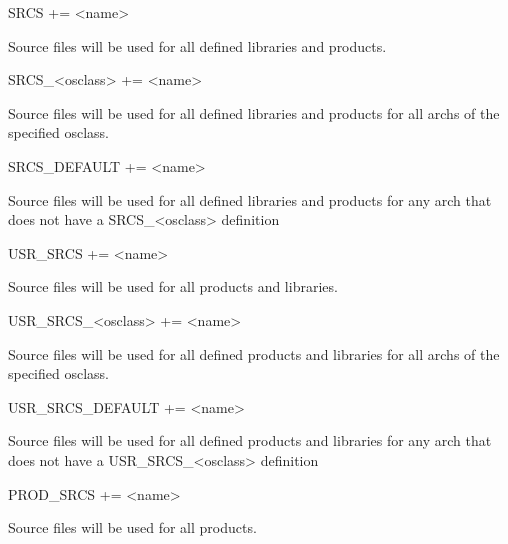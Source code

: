 \begin{description}\item {}SRCS += \textless{}name\textgreater{}

\end{description}Source files will be used for all defined libraries and products.

\begin{description}\item SRCS\_\textless{}osclass\textgreater{} += \textless{}name\textgreater{}

\end{description}Source files will be used for all defined libraries and products for all archs of the specified osclass.

\begin{description}\item SRCS\_DEFAULT += \textless{}name\textgreater{}

\end{description}Source files will be used for all defined libraries and products for any arch that does not have a 
SRCS\_\textless{}osclass\textgreater{} definition



\begin{description}\item {}USR\_SRCS += \textless{}name\textgreater{}

\end{description}Source files will be used for all products and libraries.

\begin{description}\item USR\_SRCS\_\textless{}osclass\textgreater{} += \textless{}name\textgreater{}

\end{description}Source files will be used for all defined products and libraries for all archs of the specified osclass.

\begin{description}\item USR\_SRCS\_DEFAULT += \textless{}name\textgreater{}

\end{description}Source files will be used for all defined products and libraries for any arch that does not have a 
USR\_SRCS\_\textless{}osclass\textgreater{} definition



\begin{description}\item {}PROD\_SRCS += \textless{}name\textgreater{}

\end{description}Source files will be used for all products.

